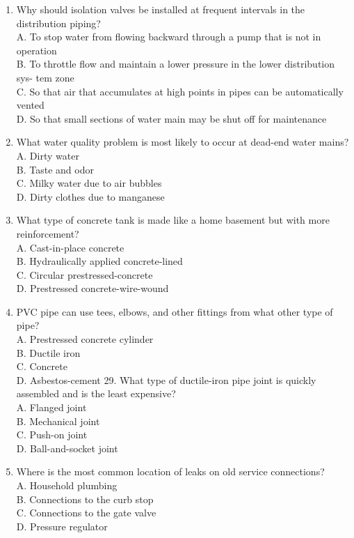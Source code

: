 \documentclass[10pt]{article}
\begin{document}
\begin{enumerate}
  \item Why should isolation valves be installed at frequent intervals in the distribution piping?\\
A. To stop water from flowing backward through a pump that is not in operation\\
B. To throttle flow and maintain a lower pressure in the lower distribution sys- tem zone\\
C. So that air that accumulates at high points in pipes can be automatically vented\\
D. So that small sections of water main may be shut off for maintenance

  \item What water quality problem is most likely to occur at dead-end water mains?\\
A. Dirty water\\
B. Taste and odor\\
C. Milky water due to air bubbles\\
D. Dirty clothes due to manganese

  \item What type of concrete tank is made like a home basement but with more reinforcement?\\
A. Cast-in-place concrete\\
B. Hydraulically applied concrete-lined\\
C. Circular prestressed-concrete\\
D. Prestressed concrete-wire-wound

  \item PVC pipe can use tees, elbows, and other fittings from what other type of pipe?\\
A. Prestressed concrete cylinder\\
B. Ductile iron\\
C. Concrete\\
D. Asbestos-cement 29. What type of ductile-iron pipe joint is quickly assembled and is the least expensive?\\
A. Flanged joint\\
B. Mechanical joint\\
C. Push-on joint\\
D. Ball-and-socket joint

  \item Where is the most common location of leaks on old service connections?\\
A. Household plumbing\\
B. Connections to the curb stop\\
C. Connections to the gate valve\\
D. Pressure regulator


\end{enumerate}
\end{document}
